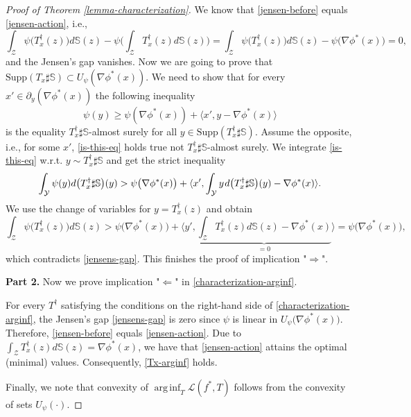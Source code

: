 \documentclass{article} %
\DeclareMathOperator*{\arginf}{arg\,inf}
\begin{document}
\begin{proof}[Proof of Theorem \ref{lemma-characterization}]
We know that \eqref{jensen-before} equals \eqref{jensen-action}, i.e., 
\begin{equation}
\int_{\mathcal{Z}}\psi\big(T_{x}^{\dagger}(z)\big)d\mathbb{S}(z)-\psi\bigg(\int_{\mathcal{Z}}T_{x}^{\dagger}(z)d\mathbb{S}(z)\bigg)=\int_{\mathcal{Z}}\psi\big(T_{x}^{\dagger}(z)\big)d\mathbb{S}(z)-\psi\big(\nabla\phi^{*}(x)\big)=0,
\label{jensens-gap}    
\end{equation}
and the Jensen's gap vanishes.
Now we are going to prove that $\text{Supp}(T_{x}\sharp\mathbb{S})\subset U_{\psi}(\nabla\phi^{*}(x))$. We need to show that for every $x'\in \partial_{y}(\nabla\phi^{*}(x))$ the following inequality
\begin{equation}\psi(y)\geq \psi(\nabla\phi^{*}(x))+\langle x',y-\nabla\phi^{*}(x)\rangle
\label{is-this-eq}
\end{equation}
is the equality $T_{x}^{\dagger}\sharp\mathbb{S}$-almost surely for all $y\in\text{Supp}(T_{x}^{\dagger}\sharp\mathbb{S})$. Assume the opposite, i.e., for some $x'$, \eqref{is-this-eq} holds true not $T_{x}^{\dagger}\sharp\mathbb{S}$-almost surely. We integrate \eqref{is-this-eq} w.r.t. $y\!\sim\! T_{x}^{\dagger}\sharp\mathbb{S}$ and get the strict inequality
\begin{equation}
    \int_{\mathcal{Y}}\psi(y)d\big(T_{x}^{\dagger}\sharp\mathbb{S}\big)(y)> \psi\big(\nabla\phi^{*}(x)\big)+\langle x',\int_{\mathcal{Y}}y\hspace{0.3mm}d\big(T_{x}^{\dagger}\sharp\mathbb{S}\big)(y)-\nabla\phi^{*}(x)\rangle.
    \nonumber
\end{equation}
We use the change of variables for $y=T_{x}^{\dagger}(z)$ and obtain
\begin{equation}
    \int_{\mathcal{Z}}\psi\big(T_{x}^{\dagger}(z)\big)d\mathbb{S}(z)>\psi\big(\nabla\phi^{*}(x)\big)+\langle y',\underbrace{\int_{\mathcal{Z}}T^{\dagger}_{x}(z)d\mathbb{S}(z)-\nabla\phi^{*}(x)}_{=0}\rangle=\psi\big(\nabla\phi^{*}(x)\big),
    \nonumber
\end{equation}
which contradicts \eqref{jensens-gap}. This finishes the proof of implication "$\Longrightarrow$".

\textbf{Part 2.} Now we prove  implication "$\Longleftarrow$" in \eqref{characterization-arginf}.

For every $T^{\dagger}$ satisfying the conditions on the right-hand side of \eqref{characterization-arginf}, the Jensen's gap \eqref{jensens-gap} is zero since $\psi$ is linear in $U_{\psi}\big(\nabla\phi^{*}(x)\big)$. Therefore, \eqref{jensen-before} equals \eqref{jensen-action}. Due to $\int_{\mathcal{Z}}T_{x}^{\dagger}(z)d\mathbb{S}(z)=\nabla\phi^{*}(x)$, we have that \eqref{jensen-action} attains the optimal (minimal) values. Consequently, \eqref{Tx-arginf} holds.

Finally, we note that convexity of $\arginf_{T}\mathcal{L}(f^{*},T)$ follows from the convexity of sets $U_{\psi}(\cdot)$. \end{proof}
\end{document}
